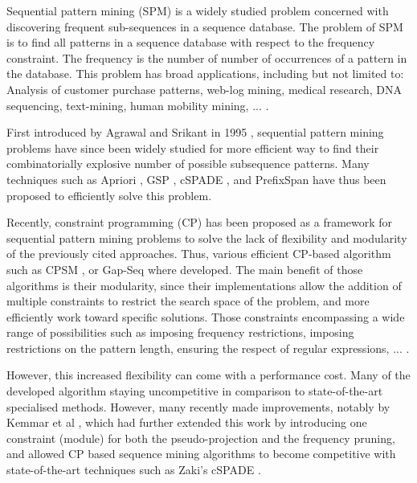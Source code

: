 \documentclass{eplmastersthesis}
\begin{document}
Sequential pattern mining (SPM) is a widely studied problem concerned with discovering frequent sub-sequences in a sequence database. The problem of SPM is to find all patterns in a sequence database with respect to the frequency constraint. The frequency is the number of number of occurrences of a pattern in the database. This problem has broad applications, including but not limited to: Analysis of customer purchase patterns, web-log mining, medical research, DNA sequencing, text-mining, human mobility mining, ... \cite{mabroukeh2010taxonomy}. \newline

First introduced by Agrawal and Srikant in 1995 \cite{agrawal1995mining}, sequential pattern mining problems have since been widely studied for more efficient way to find their combinatorially explosive number of possible subsequence patterns. Many techniques such as Apriori \cite{agrawal1995mining}, GSP \cite{srikant1996mining}, cSPADE  \cite{zaki2000sequence}, and PrefixSpan \cite{pei2004mining} have thus been proposed to efficiently solve this problem. \newline

Recently, constraint programming (CP) has been proposed as a framework for sequential pattern mining problems to solve the lack of flexibility and modularity of the previously cited approaches. Thus, various efficient CP-based algorithm such as CPSM \cite{negrevergne2015constraint}, or Gap-Seq \cite{kemmar2016global} where developed. The main benefit of those algorithms is their modularity, since their implementations allow the addition of multiple constraints to restrict the search space of the problem, and more efficiently work toward specific solutions. Those constraints encompassing a wide range of possibilities such as imposing frequency restrictions, imposing restrictions on the pattern length, ensuring the respect of regular expressions, ... . \newline

However, this increased flexibility can come with a performance cost. Many of the developed algorithm staying uncompetitive in comparison to state-of-the-art specialised methods.
However, many recently made improvements, notably by Kemmar et al \cite{kemmar2015prefix, kemmar2016global}, which had further extended this work by introducing one constraint (module) for both the pseudo-projection and the frequency pruning, and allowed CP based sequence mining algorithms to become competitive with state-of-the-art techniques such as Zaki's cSPADE \cite{zaki2001spade}. \newline
\end{document}
